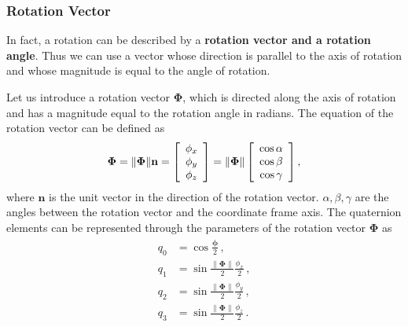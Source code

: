 \documentclass[journal]{IEEEtran}
\DeclarePairedDelimiter{\norm}{\lVert}{\rVert}
\begin{document}
%
\subsubsection{Rotation Vector}
In fact, a rotation can be described by a \textbf{ rotation vector and a rotation angle}. Thus we can use a vector whose direction is parallel to the axis of rotation and whose magnitude is equal to the angle of rotation.

Let us introduce a rotation vector $\mathbf{\Phi}$, which is directed along the axis of rotation and has a magnitude equal to the rotation angle in radians. The equation of the rotation vector can be defined as
\begin{equation}
    \mathbf{\Phi} = \norm{\mathbf{\Phi}}\mathbf{n}
    = \left[\begin{array}{c}
    \mathbf{\phi}_x\\
    \mathbf{\phi}_y\\
    \mathbf{\phi}_z\\
    \end{array} \right] 
    =\norm {\mathbf{\Phi}}
    \left[\begin{array}{c}
    \mathbf{\cos\alpha}\\
    \mathbf{\cos\beta}\\
    \mathbf{\cos\gamma}\\
    \end{array}
        \right],
\end{equation}
where $\mathbf{n}$ is the unit vector in the direction of the rotation vector.
$\alpha, \beta, \gamma$ are the angles between the rotation vector and the coordinate frame axis. The quaternion elements can be represented through the parameters of the rotation vector $\mathbf{\Phi}$ as
\begin{equation}
        \begin{array}{c}
        \begin{aligned}
         q_0 &= \cos\frac{\mathbf{\phi}}{2} \,,  \\
         
         q_1 &= \sin\frac{\mathbf{\|\Phi\|}}{2}\frac{{\phi}_x}{2}\,, \\
         
         q_2 &= \sin\frac{\mathbf{\|\Phi\|}}{2}\frac{{\phi}_y}{2}\,, \\
         
         q_3 &= \sin\frac{\mathbf{\|\Phi\|}}{2}\frac{{\phi}_z}{2}\,. \\
         \end{aligned}
        \end{array}
        \label{eq_quaternion}
\end{equation}
\end{document}
